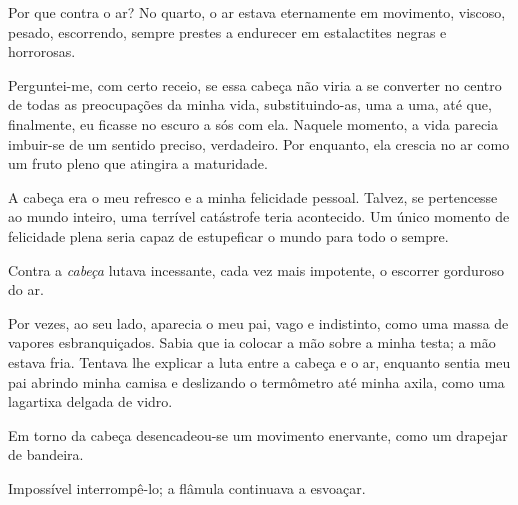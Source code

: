
Por que contra o ar? No quarto, o ar estava eternamente em movimento, viscoso,
pesado, escorrendo, sempre prestes a endurecer em estalactites negras e
horrorosas.




Perguntei-me, com certo receio, se essa cabeça não viria a se converter no
centro de todas as preocupações da minha vida, substituindo-as, uma a uma,
até que, finalmente, eu ficasse no escuro a sós com ela. Naquele momento, a
vida parecia imbuir-se de um sentido preciso, verdadeiro. Por enquanto, ela
crescia no ar como um fruto pleno que atingira a maturidade.

A cabeça era o meu refresco e a minha felicidade pessoal. Talvez, se
pertencesse ao mundo inteiro, uma terrível catástrofe teria acontecido. Um
único momento de felicidade plena seria capaz de estupeficar o mundo para
todo o sempre.

Contra a \textit{cabeça} lutava incessante, cada vez mais impotente, o
escorrer gorduroso do ar.

Por vezes, ao seu lado, aparecia o meu pai, vago e indistinto, como uma massa
de vapores esbranquiçados. Sabia que ia colocar a mão sobre a minha testa; a
mão estava fria. Tentava lhe explicar a luta entre a cabeça e o ar, enquanto
sentia meu pai abrindo minha camisa e deslizando o termômetro até minha
axila, como uma lagartixa delgada de vidro.

Em torno da cabeça desencadeou-se um movimento enervante, como um drapejar de
bandeira.

Impossível interrompê-lo; a flâmula continuava a esvoaçar.


